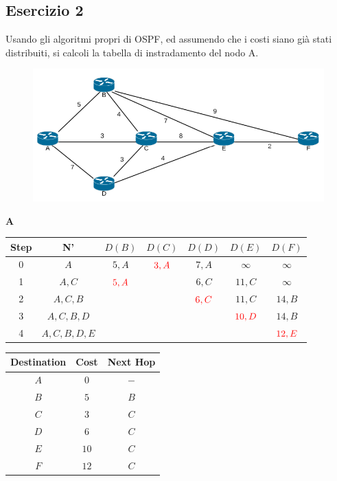 \documentclass[10pt]{article}
\begin{document}
		\subsection{Esercizio 2}
			Usando gli algoritmi propri di OSPF, ed assumendo che i costi siano già stati distribuiti, si calcoli la tabella di instradamento del nodo A.
			\begin{figure}[h]
				\centering
				\includegraphics[width=13cm]{es2}
			\end{figure}
			\begin{center}
				\textbf{A}
				\begin{tabular}{||c c c c c c c||} 
					\hline
					Step & N' & $D(B)$ & $D(C)$ & $D(D)$ & $D(E)$ & $D(F)$ \\[0.5ex] 
					\hline\hline
					0 & $A$ & $5,A$ & $\color{red} 3,A$ & $7,A$ & $\infty$ & $\infty$ \\ 
					\hline
					1 & $A,C$ & $\color{red} 5,A$ & & $6,C$ & $11,C$ & $\infty$ \\ 
					\hline
					2 & $A,C,B$ & & & $\color{red} 6,C$ & $11,C$ & $14,B$ \\
					\hline
					3 & $A,C,B,D$ & & & & $\color{red} 10,D$ & $14,B$ \\
					\hline
					4 & $A,C,B,D,E$ & & & & & $\color{red} 12,E$ \\[0.5ex] 
					\hline
				\end{tabular}
				\quad
				\begin{tabular}{||c || c || c||}
					\hline
					Destination & Cost & Next Hop \\[0.5ex] 
					\hline\hline
					$A$ & $0$ & $-$ \\
					$B$ & $5$ & $B$ \\
					$C$ & $3$ & $C$ \\
					$D$ & $6$ & $C$ \\
					$E$ & $10$ & $C$ \\
					$F$ & $12$ & $C$ \\[0.5ex] 
					\hline
				\end{tabular}
			\end{center}
		
\end{document}
